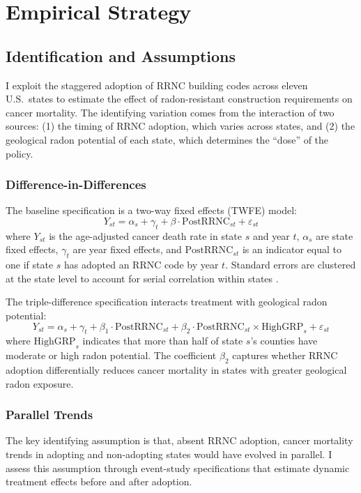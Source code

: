 \documentclass[12pt]{article}
\begin{document}



\section{Empirical Strategy}

\subsection{Identification and Assumptions}

I exploit the staggered adoption of RRNC building codes across eleven U.S.\ states to estimate the effect of radon-resistant construction requirements on cancer mortality. The identifying variation comes from the interaction of two sources: (1) the timing of RRNC adoption, which varies across states, and (2) the geological radon potential of each state, which determines the ``dose'' of the policy.

\subsubsection*{Difference-in-Differences} The baseline specification is a two-way fixed effects (TWFE) model:
\begin{equation}
Y_{st} = \alpha_s + \gamma_t + \beta \cdot \text{PostRRNC}_{st} + \varepsilon_{st}
\label{eq:twfe}
\end{equation}
where $Y_{st}$ is the age-adjusted cancer death rate in state $s$ and year $t$, $\alpha_s$ are state fixed effects, $\gamma_t$ are year fixed effects, and $\text{PostRRNC}_{st}$ is an indicator equal to one if state $s$ has adopted an RRNC code by year $t$. Standard errors are clustered at the state level to account for serial correlation within states \citep{bertrand2004much}.

The triple-difference specification interacts treatment with geological radon potential:
\begin{equation}
Y_{st} = \alpha_s + \gamma_t + \beta_1 \cdot \text{PostRRNC}_{st} + \beta_2 \cdot \text{PostRRNC}_{st} \times \text{HighGRP}_s + \varepsilon_{st}
\label{eq:triple}
\end{equation}
where $\text{HighGRP}_s$ indicates that more than half of state $s$'s counties have moderate or high radon potential. The coefficient $\beta_2$ captures whether RRNC adoption differentially reduces cancer mortality in states with greater geological radon exposure.

\subsubsection*{Parallel Trends} The key identifying assumption is that, absent RRNC adoption, cancer mortality trends in adopting and non-adopting states would have evolved in parallel. I assess this assumption through event-study specifications that estimate dynamic treatment effects before and after adoption.
\end{document}
